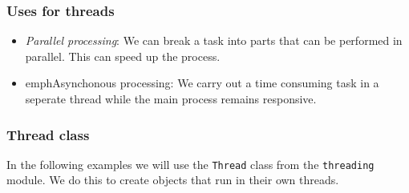 \documentclass[10pt]{beamer}
\begin{document}
\begin{frame}
	\frametitle{Uses for threads}

	\begin{itemize}
		\item \emph{Parallel processing}: We can break a 
			task into parts that can be performed in 
			parallel.  This can speed up the process.
		\item emph{Asynchonous processing}: We carry out a
			time consuming task in a seperate thread while
			the main process remains responsive.
	\end{itemize}
\end{frame}

\begin{frame}
	\frametitle{Thread class}

	In the following examples we will use the \texttt{Thread}
	class from the \texttt{threading} module. We do this to 
	create objects that run in their own threads.
\end{frame}
\end{document}
